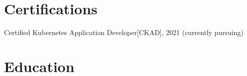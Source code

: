 \documentclass[]{deedy-resume-reversed}
\begin{document}
\begin{minipage}[t]{0.33\textwidth}
\section{Certifications}
Certified Kubernetes Application Developer[CKAD], 2021 (currently pursuing)
\sectionsep


% 
% 


\section{Education}

\sectionsep





\end{minipage}
\end{document}
